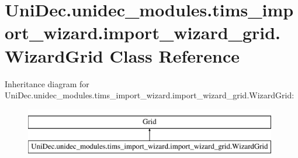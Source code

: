 \hypertarget{class_uni_dec_1_1unidec__modules_1_1tims__import__wizard_1_1import__wizard__grid_1_1_wizard_grid}{}\section{Uni\+Dec.\+unidec\+\_\+modules.\+tims\+\_\+import\+\_\+wizard.\+import\+\_\+wizard\+\_\+grid.\+Wizard\+Grid Class Reference}
\label{class_uni_dec_1_1unidec__modules_1_1tims__import__wizard_1_1import__wizard__grid_1_1_wizard_grid}
Inheritance diagram for Uni\+Dec.\+unidec\+\_\+modules.\+tims\+\_\+import\+\_\+wizard.\+import\+\_\+wizard\+\_\+grid.\+Wizard\+Grid\+:\begin{figure}[H]
\begin{center}
\leavevmode
\includegraphics[height=2.000000cm]{class_uni_dec_1_1unidec__modules_1_1tims__import__wizard_1_1import__wizard__grid_1_1_wizard_grid}
\end{center}
\end{figure}
